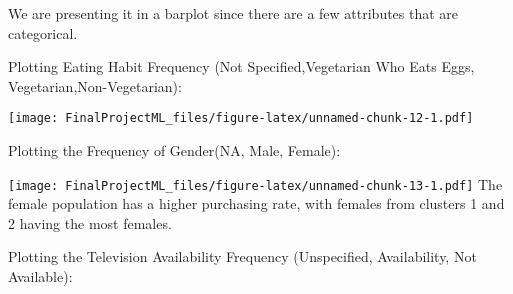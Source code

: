 \documentclass[
]{article}
\newenvironment{Shaded}{\begin{snugshade}}{\end{snugshade}}
\newcommand{\DataTypeTok}[1]{\textcolor[rgb]{0.13,0.29,0.53}{#1}}
\newcommand{\KeywordTok}[1]{\textcolor[rgb]{0.13,0.29,0.53}{\textbf{#1}}}
\newcommand{\NormalTok}[1]{#1}
\newcommand{\OperatorTok}[1]{\textcolor[rgb]{0.81,0.36,0.00}{\textbf{#1}}}
\newcommand{\OtherTok}[1]{\textcolor[rgb]{0.56,0.35,0.01}{#1}}
\newcommand{\StringTok}[1]{\textcolor[rgb]{0.31,0.60,0.02}{#1}}
\begin{document}
We are presenting it in a barplot since there are a few attributes that
are categorical.

Plotting Eating Habit Frequency (Not Specified,Vegetarian Who Eats Eggs,
Vegetarian,Non-Vegetarian):

\begin{Shaded}
\end{Shaded}

\texttt{[image: FinalProjectML\_files/figure-latex/unnamed-chunk-12-1.pdf]}

Plotting the Frequency of Gender(NA, Male, Female):

\begin{Shaded}
\end{Shaded}

\texttt{[image: FinalProjectML\_files/figure-latex/unnamed-chunk-13-1.pdf]}
The female population has a higher purchasing rate, with females from
clusters 1 and 2 having the most females.

Plotting the Television Availability Frequency (Unspecified,
Availability, Not Available):

\begin{Shaded}
\end{Shaded}
\end{document}
